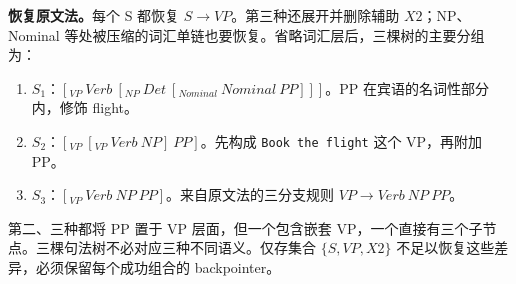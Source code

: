 \begin{workedsolution}
\textbf{恢复原文法。}每个 S 都恢复 $S\rightarrow VP$。第三种还展开并删除辅助 $X2$；NP、Nominal 等处被压缩的词汇单链也要恢复。省略词汇层后，三棵树的主要分组为：
\begin{enumerate}
  \item $S_1$：$[_{VP}\ Verb\ [_{NP}\ Det\ [_{Nominal}\ Nominal\ PP]]]$。PP 在宾语的名词性部分内，修饰 flight。
  \item $S_2$：$[_{VP}\ [_{VP}\ Verb\ NP]\ PP]$。先构成 \texttt{Book the flight} 这个 VP，再附加 PP。
  \item $S_3$：$[_{VP}\ Verb\ NP\ PP]$。来自原文法的三分支规则 $VP\rightarrow Verb\ NP\ PP$。
\end{enumerate}
第二、三种都将 PP 置于 VP 层面，但一个包含嵌套 VP，一个直接有三个子节点。三棵句法树不必对应三种不同语义。仅存集合 $\{S,VP,X2\}$ 不足以恢复这些差异，必须保留每个成功组合的 backpointer。
\end{workedsolution}
